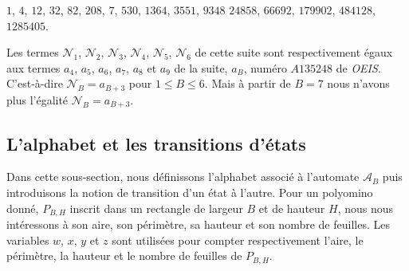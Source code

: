 $1$, $4$, $12$, $32$, $82$, $208$, $7$, $530$, $1364$, $3551$, $9348$
 $24858$, $66692$, $179902$, $484128$, $1285405$.

Les termes $\mathcal{N}_{1}$, $\mathcal{N}_{2}$, $\mathcal{N}_{3}$, $\mathcal{N}_{4}$, $\mathcal{N}_{5}$, $\mathcal{N}_{6}$  de cette suite sont respectivement égaux aux termes $a_{4}$, $a_{5}$, $a_{6}$, $a_{7}$, $a_{8}$ et $a_{9}$ de la suite, $a_{B}$, numéro $A135248$ de \emph{OEIS}. C'est-à-dire $\mathcal{N}_{B}=a_{B+3}$ pour $1\leq B\leq 6$. Mais à partir de $B=7$ nous n'avons plus l'égalité $\mathcal{N}_{B}=a_{B+3}$. 
\begin{spacing}{0.30}
\subsection{L'alphabet et les transitions d'états}
\end{spacing}
Dans cette sous-section, nous définissons l'alphabet associé à l'automate $\mathcal{A}_{B}$ puis  introduisons la notion de transition d'un état à l'autre. Pour un polyomino donné, $P_{B,H}$ inscrit dans un rectangle de largeur $B$ et de hauteur $H$, nous nous intéressons à son aire, son périmètre, sa hauteur et son nombre de feuilles. Les variables $w$, $x$, $y$ et $z$ sont utilisées pour compter respectivement l'aire, le périmètre, la hauteur et le nombre de feuilles de $P_{B,H}$.

